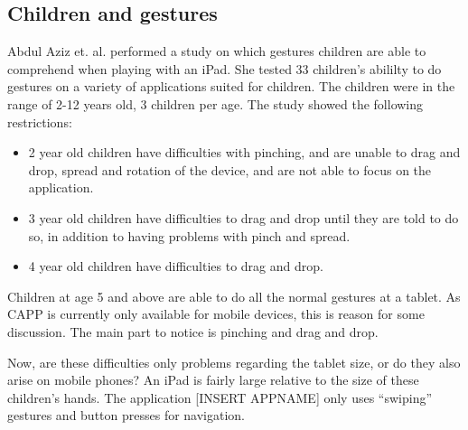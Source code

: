 \subsection{Children and gestures}

Abdul Aziz et. al. \cite{aziz2013children} performed a study on which gestures children are able to comprehend when playing with an iPad. She tested 33 children's abililty to do gestures on a variety of applications suited for children. The children were in the range of 2-12 years old, 3 children per age. The study showed the following restrictions:

\begin{itemize}
  \item 2 year old children have difficulties with pinching, and are unable to drag and drop, spread and rotation of the device, and are not able to focus on the application. 
  \item 3 year old children have difficulties to drag and drop until they are told to do so, in addition to having problems with pinch and spread. 
  \item 4 year old children have difficulties to drag and drop. 
\end{itemize}
Children at age 5 and above are able to do all the normal gestures at a tablet. As CAPP is currently only available for mobile devices, this is reason for some discussion. The main part to notice is pinching and drag and drop. 

Now, are these difficulties only problems regarding the tablet size, or do they also arise on mobile phones? An iPad is fairly large relative to the size of these children's hands. The application [INSERT APPNAME] only uses ``swiping'' gestures and button presses for navigation.

